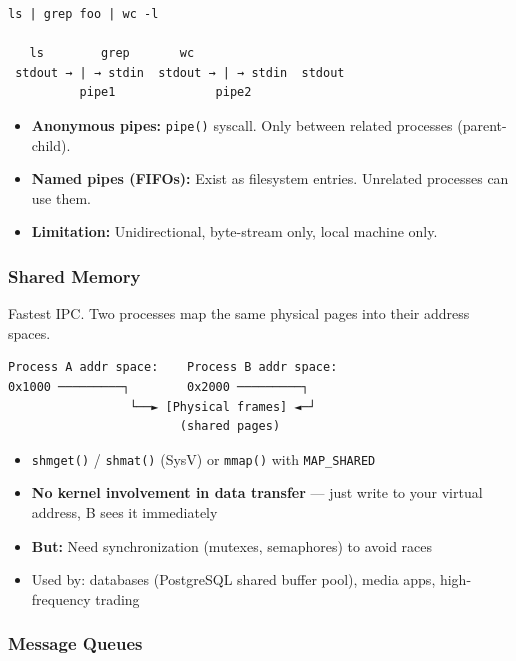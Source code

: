 \documentclass[11pt]{article}
\providecommand{\tightlist}{\setlength{\itemsep}{1pt}\setlength{\parskip}{0pt}}
\begin{document}
\begin{verbatim}
ls | grep foo | wc -l

   ls        grep       wc
 stdout → | → stdin  stdout → | → stdin  stdout
          pipe1              pipe2
\end{verbatim}

\begin{itemize}
\tightlist
\item
  \textbf{Anonymous pipes:} \texttt{pipe()} syscall. Only between related processes (parent-child).
\item
  \textbf{Named pipes (FIFOs):} Exist as filesystem entries. Unrelated processes can use them.
\item
  \textbf{Limitation:} Unidirectional, byte-stream only, local machine only.
\end{itemize}

\subsubsection{Shared Memory}\label{shared-memory}

Fastest IPC. Two processes map the same physical pages into their address spaces.

\setcodelang{}

\begin{verbatim}
Process A addr space:    Process B addr space:
0x1000 ─────────┐        0x2000 ─────────┐
                 └──► [Physical frames] ◄─┘
                        (shared pages)
\end{verbatim}

\begin{itemize}
\tightlist
\item
  \texttt{shmget()} / \texttt{shmat()} (SysV) or \texttt{mmap()} with \texttt{MAP\_SHARED}
\item
  \textbf{No kernel involvement in data transfer} --- just write to your virtual address, B sees it immediately
\item
  \textbf{But:} Need synchronization (mutexes, semaphores) to avoid races
\item
  Used by: databases (PostgreSQL shared buffer pool), media apps, high-frequency trading
\end{itemize}

\subsubsection{Message Queues}\label{message-queues}
\end{document}
